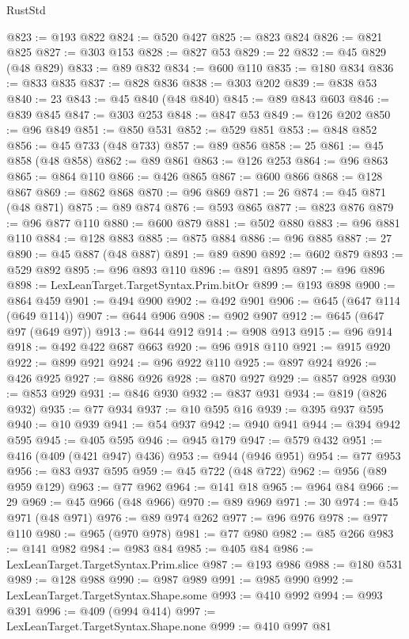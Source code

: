 \begin{lexlean}{RustStd}
\begin{coremodule}
@823 := @193 @822
@824 := @520 @427
@825 := @823 @824
@826 := @821 @825
@827 := @303 @153
@828 := @827 @53
@829 := 22
@832 := @45 @829 (@48 @829)
@833 := @89 @832
@834 := @600 @110
@835 := @180 @834
@836 := @833 @835
@837 := @828 @836
@838 := @303 @202
@839 := @838 @53
@840 := 23
@843 := @45 @840 (@48 @840)
@845 := @89 @843 @603
@846 := @839 @845
@847 := @303 @253
@848 := @847 @53
@849 := @126 @202
@850 := @96 @849
@851 := @850 @531
@852 := @529 @851
@853 := @848 @852
@856 := @45 @733 (@48 @733)
@857 := @89 @856
@858 := 25
@861 := @45 @858 (@48 @858)
@862 := @89 @861
@863 := @126 @253
@864 := @96 @863
@865 := @864 @110
@866 := @426 @865
@867 := @600 @866
@868 := @128 @867
@869 := @862 @868
@870 := @96 @869
@871 := 26
@874 := @45 @871 (@48 @871)
@875 := @89 @874
@876 := @593 @865
@877 := @823 @876
@879 := @96 @877 @110
@880 := @600 @879
@881 := @502 @880
@883 := @96 @881 @110
@884 := @128 @883
@885 := @875 @884
@886 := @96 @885
@887 := 27
@890 := @45 @887 (@48 @887)
@891 := @89 @890
@892 := @602 @879
@893 := @529 @892
@895 := @96 @893 @110
@896 := @891 @895
@897 := @96 @896
@898 := LexLeanTarget.TargetSyntax.Prim.bitOr
@899 := @193 @898
@900 := @864 @459
@901 := @494 @900
@902 := @492 @901
@906 := @645 (@647 @114 (@649 @114))
@907 := @644 @906
@908 := @902 @907
@912 := @645 (@647 @97 (@649 @97))
@913 := @644 @912
@914 := @908 @913
@915 := @96 @914
@918 := @492 @422 @687 @663
@920 := @96 @918 @110
@921 := @915 @920
@922 := @899 @921
@924 := @96 @922 @110
@925 := @897 @924
@926 := @426 @925
@927 := @886 @926
@928 := @870 @927
@929 := @857 @928
@930 := @853 @929
@931 := @846 @930
@932 := @837 @931
@934 := @819 (@826 @932)
@935 := @77 @934
@937 := @10 @595 @16
@939 := @395 @937 @595
@940 := @10 @939
@941 := @54 @937
@942 := @940 @941
@944 := @394 @942 @595
@945 := @405 @595
@946 := @945 @179
@947 := @579 @432
@951 := @416 (@409 (@421 @947) @436)
@953 := @944 (@946 @951)
@954 := @77 @953
@956 := @83 @937 @595
@959 := @45 @722 (@48 @722)
@962 := @956 (@89 @959 @129)
@963 := @77 @962
@964 := @141 @18
@965 := @964 @84
@966 := 29
@969 := @45 @966 (@48 @966)
@970 := @89 @969
@971 := 30
@974 := @45 @971 (@48 @971)
@976 := @89 @974 @262
@977 := @96 @976
@978 := @977 @110
@980 := @965 (@970 @978)
@981 := @77 @980
@982 := @85 @266
@983 := @141 @982
@984 := @983 @84
@985 := @405 @84
@986 := LexLeanTarget.TargetSyntax.Prim.slice
@987 := @193 @986
@988 := @180 @531
@989 := @128 @988
@990 := @987 @989
@991 := @985 @990
@992 := LexLeanTarget.TargetSyntax.Shape.some
@993 := @410 @992
@994 := @993 @391
@996 := @409 (@994 @414)
@997 := LexLeanTarget.TargetSyntax.Shape.none
@999 := @410 @997 @81

\end{coremodule}
\end{lexlean}
